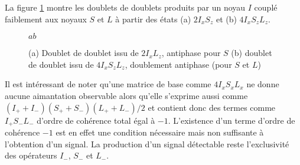 La figure \ref{fig:ixzz-isl} montre les doublets de doublets produits par un noyau
$I$ couplé faiblement aux noyaux $S$ et $L$ à partir des états (a) $2I_xS_z$
et (b) $4I_xS_zL_z$.

\begin{figure}[hbt]
\begin{center}
$a$\hspace{1.5in}\hspace{1cm}$b$\hspace{1.5in}$\mbox{ }$\\
 \hspace{1cm}
\end{center}
\caption[Doublets de doublets produits par un système $ISL$]{
\label{fig:ixzz-isl}
(a) Doublet de doublet issu de $2I_xL_z$, antiphase pour $S$ 
(b) doublet de doublet issu de $4I_xS_zL_z$, doublement antiphase (pour $S$ et $L$)}
\end{figure}

Il est intéressant de noter qu'une matrice de base 
comme $4I_xS_xL_x$ ne donne aucune aimantation 
observable alors qu'elle s'exprime aussi comme 
$(I_+ + I_-)(S_+ + S_-)(L_+ + L_-)/2$ et 
contient donc des termes comme $I_+S_-L_-$ d'ordre de cohérence total
égal à $-1$. 
L'existence d'un terme d'ordre de cohérence $-1$ est en effet une condition nécessaire 
mais non suffisante à l'obtention d'un signal.
La production d'un signal détectable reste l'exclusivité des opérateurs
$I_-$, $S_-$ et $L_-$.
